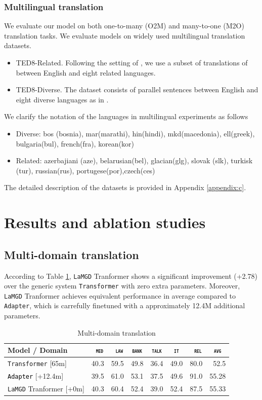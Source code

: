 \documentclass[11pt]{article}
\newcommand{\revision}[1]{\textcolor{black}{#1}}
\newcommand{\domain}[1]{\texttt{\textsc{#1}}}
\newcommand{\system}[1]{\texttt{{#1}}}
\begin{document}
\subsubsection{Multilingual translation}
We evaluate our model on both one-to-many (O2M) and many-to-one (M2O)
translation tasks. We evaluate models on widely used multilingual translation datasets.
\begin{itemize}
	\item TED8-Related. Following the setting of \citet{Wang20balancing}, we use a subset of translations of \citet{qi18when} between English and eight related languages.
	\item TED8-Diverse. The dataset consists of parallel sentences between English and eight diverse languages as in \citet{Wang20balancing}.
\end{itemize}
We clarify the notation of the languages in multilingual experiments as follows
\begin{itemize}
	\item Diverse: bos (bosnia), mar(marathi),
         hin(hindi), mkd(macedonia), ell(greek),
         bulgaria(bul), french(fra), korean(kor) 
	\item Related: azerbajiani (aze), belarusian(bel),
          glacian(glg), slovak (slk), turkisk (tur),
		  russian(rus), portugese(por),czech(ces)
\end{itemize}
The detailed description of the datasets is provided in Appendix \ref{appendix:c}.
\section{Results and ablation studies}
\subsection{Multi-domain translation}
According to Table \ref{tab:mdmt}, \system{LaMGD} Tranformer shows a significant improvement (+2.78) over the generic system \system{Transformer} with zero extra parameters. Moreover, \system{LaMGD} Tranformer achieves equivalent performance in average compared to \system{Adapter}, which is carrefully finetuned with a approximately 12.4M additional parameters.
\begin{table}[h!]
  \centering
  \begin{tabular}{|p{4cm}|*{7}{r|}} \hline
    Model / Domain & \multicolumn{1}{c|}{\domain{ med}} & \multicolumn{1}{c|}{\domain{ law}} & \multicolumn{1}{c|}{\domain{bank}} & \multicolumn{1}{c|}{\domain{talk}} & \multicolumn{1}{c|}{\domain{ it }} & \multicolumn{1}{c|}{\domain{ rel}} & \multicolumn{1}{c|}{\domain{avg}} \\ \hline 
    \system{Transformer}  \hfill{\footnotesize[65m]} & 40.3 & 59.5 & 49.8 & 36.4 & 49.0 & 80.0  & 52.5\\
    \revision{\system{Adapter}}   \hfill{\footnotesize[+12.4m]}  & 39.5 & 61.0 & 53.1 & 37.5 & 49.6 & 91.0 & 55.28 \\ 
    \system{LaMGD} Tranformer   \hfill{\footnotesize[+0m]}  & 40.3 & 60.4 & 52.4 & 39.0 & 52.4 & 87.5 & 55.33 \\ 
    \hline
  \end{tabular}
  \caption{Multi-domain translation}
  \label{tab:mdmt}
\end{table}
\end{document}
